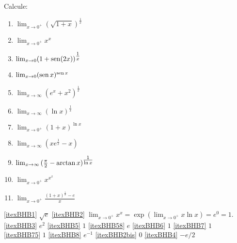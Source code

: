 \begin{exo} Calcule:
\begin{multicols}{3}
\begin{enumerate}
\item\label{itexBHB1} $\lim_{x\to 0^+}(\sqrt{1+x})^{\tfrac1x}$
\item\label{itexBHB2} $\lim_{x\to 0^+}x^x$
\item\label{itexBHB3} $\lim_{x\to 0}(1+\operatorname{sen} (2x))^{\tfrac1x}$
\item\label{itexBHB5} $\lim_{x\to 0}(\operatorname{sen} x)^{\operatorname{sen} x}$
\item\label{itexBHB58} $\lim_{x\to \infty}(e^x+ x^2)^{\tfrac1x}$
\item\label{itexBHB6} $\lim_{x\to \infty}(\ln x)^{\tfrac1x}$
\item\label{itexBHB7} $\lim_{x\to 0^+}(1+x)^{\ln x}$
\item\label{itexBHB75} $\lim_{x\to \infty}(xe^{\tfrac1x}-x)$
\item\label{itexBHB8} {\footnotesize{$\lim_{x\to \infty}{(\tfrac{\pi}{2}-\arctan
x)^{\tfrac{1}{\ln x}}}$}}
\item\label{itexBHB2bis} $\lim_{x\to 0^+}x^{x^x}$
\item\label{itexBHB4} $\lim_{x\to 0^+}\frac{(1+x)^{\tfrac1x}-e}{x}$
\end{enumerate}
\end{multicols}
\vspace{0.01cm}
\begin{sol} 
\eqref{itexBHB1} $\sqrt{e}$
\eqref{itexBHB2} $\lim_{x\to 0^+}x^x=\exp(\lim_{x\to 0^+}x\ln x)=e^0=1$.
\eqref{itexBHB3} $e^2$
\eqref{itexBHB5} $1$
\eqref{itexBHB58} $e$
\eqref{itexBHB6} $1$
\eqref{itexBHB7} $1$
\eqref{itexBHB75} $1$
\eqref{itexBHB8} $e^{-1}$
\eqref{itexBHB2bis} $0$
\eqref{itexBHB4} $-e/2$
\end{sol}
\end{exo}

